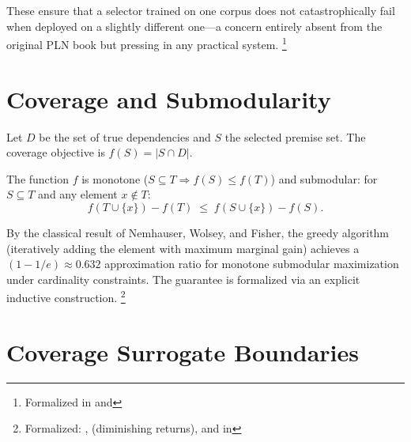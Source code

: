 \documentclass[11pt,openany]{report}
\begin{document}
\noindent
These ensure that a selector trained on one corpus does not
catastrophically fail when deployed on a slightly different one---a
concern entirely absent from the original PLN book but pressing in
any practical system.%
\footnote{Formalized in
 and
}


\section{Coverage and Submodularity}
\label{sec:coverage}

Let $D$ be the set of true dependencies and $S$ the selected premise
set.  The coverage objective is $f(S) = |S \cap D|$.

\begin{theorem}
\label{thm:coverage-submod}
The function $f$ is monotone ($S \subseteq T \Rightarrow f(S) \le f(T)$)
and submodular: for $S \subseteq T$ and any element $x \notin T$:
\[
  f(T \cup \{x\}) - f(T) \;\le\; f(S \cup \{x\}) - f(S).
\]
\end{theorem}

\noindent
By the classical result of Nemhauser, Wolsey, and Fisher, the greedy
algorithm (iteratively adding the element with maximum marginal gain)
achieves a $(1 - 1/e) \approx 0.632$ approximation ratio for monotone
submodular maximization under cardinality constraints.  The guarantee
is formalized via an explicit  inductive
construction.%
\footnote{Formalized:
,
 (diminishing returns),
and  in
}



\section{Coverage Surrogate Boundaries}
\label{sec:surrogate-nogo}
\end{document}
